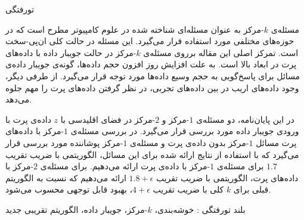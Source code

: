


\pagestyle{empty}

‌تورفتگی

مسئله‌ی $k$-مرکز به عنوان مسئله‌ای شناخته شده در علوم کامپیوتر مطرح است که در حوزه‌های مختلفی مورد استفاده قرار می‌گیرد.  این مسئله در حالت کلی ان‌پی-سخت است. تمرکز اصلی این مقاله برروی مسئله‌ی $k$-مرکز در حالت جویبار داده با داده‌های پرت در ابعاد بالا است. به علت افزایش روز افزون حجم داده‌ها، گونه‌ی جویبار داده‌ی مسائل برای پاسخ‌گویی به حجم وسیع داده‌ها مورد توجه قرار می‌گیرد. از طرفی دیگر، وجود داده‌های اریب در بین داده‌های تجربی، در نظر گرفتن داده‌های پرت را مهم جلوه می‌دهد.

در این پایان‌نامه، دو مسئله‌ی $1$-مرکز و $2$-مرکز در فضای اقلیدسی با $z$ داده‌ی پرت با ورودی جویبار داده مورد بررسی قرار می‌گیرد. در بررسی مسئله‌ی $1$-مرکز با داده‌های پرت مسائل $1$-مرکز بدون داده‌ی پرت و مسئله‌ی $1$-مرکز پوشاننده مورد بررسی قرار می‌گیرد که با استفاده از نتایج ارائه شده برای این مسائل، الگوریتمی با ضریب تقریب $1.7$ برای مسئله‌ی $1$-مرکز با داده‌ی پرت ارائه می‌دهیم. برای مسئله‌ی $2$-مرکز با داده‌های پرت، الگوریتمی با ضریب تقریب $1.8 + \epsilon$ ارائه می‌دهیم که نسبت به الگوریتم قبلی برای $k$ کلی با ضریب تقریب $4 + \epsilon$، بهبود قابل توجهی محسوب می‌شود.

‌بلند
‌تورفتگی : 
خوشه‌بندی، $k$-مرکز، جویبار داده، الگوریتم تقریبی
‌جدید
